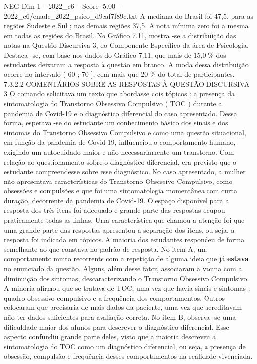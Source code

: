 \begin{textsample}{NEG Dim 1 – 2022\_c6 – Score -5.00 – 2022\_c6/enade\_2022\_psico\_d9caf7f89c.txt}
A mediana do Brasil foi 47,5, para as regiões Sudeste e Sul ; nas demais regiões 37,5.
A nota mínima zero foi a mesma em todas as regiões do Brasil.
No Gráfico 7.11, mostra -se a distribuição das notas na Questão Discursiva 3, do Componente Específico da área de Psicologia.
Destaca -se, com base nos dados do Gráfico 7.11, que mais de 15,0 \% dos estudantes deixaram a resposta à questão em branco.
A moda dessa distribuição ocorre no intervalo ( 60 ; 70 ], com mais que 20 \% do total de participantes. 7.3.2.2 COMENTÁRIOS SOBRE AS RESPOSTAS À QUESTÃO DISCURSIVA 3 O comando solicitava um texto que abordasse dois tópicos : a presença da sintomatologia do Transtorno Obsessivo Compulsivo ( TOC ) durante a pandemia de Covid-19 e o diagnóstico diferencial do caso apresentado.
Dessa forma, esperava -se do estudante um conhecimento básico dos sinais e dos sintomas do Transtorno Obsessivo Compulsivo e como uma questão situacional, em função da pandemia de Covid-19, influenciou o comportamento humano, exigindo um autocuidado maior e não necessariamente um transtorno.
Com relação ao questionamento sobre o diagnóstico diferencial, era previsto que o estudante compreendesse sobre esse diagnóstico.
No caso apresentado, a mulher não apresentava características do Transtorno Obsessivo Compulsivo, como obsessões e compulsões e que foi uma sintomatologia momentânea com curta duração, decorrente da pandemia de Covid-19.
O espaço disponível para a resposta dos três itens foi adequado e grande parte das respostas ocupou praticamente todas as linhas.
Uma característica que chamou a atenção foi que uma grande parte das respostas apresentou a separação dos itens, ou seja, a resposta foi indicada em tópicos.
A maioria dos estudantes respondeu de forma semelhante ao que constava no padrão de resposta.
No item A, um comportamento muito recorrente com a repetição de alguma ideia que já \textbf{estava} no enunciado da questão.
Alguns, além desse fator, associaram a vacina com a diminuição dos sintomas, descaracterizando o Transtorno Obsessivo Compulsivo.
A minoria afirmou que se tratava de TOC, uma vez que havia sinais e sintomas : quadro obsessivo compulsivo e a frequência dos comportamentos.
Outros colocaram que precisaria de mais dados da paciente, uma vez que acreditavam não ter dados suficientes para avaliação correta.
No item B, observa -se uma dificuldade maior dos alunos para descrever o diagnóstico diferencial.
Esse aspecto confundiu grande parte deles, visto que a maioria descreveu a sintomatologia do TOC como um diagnóstico diferencial, ou seja, a presença de obsessão, compulsão e frequência desses comportamentos na realidade vivenciada.

\end{textsample}
